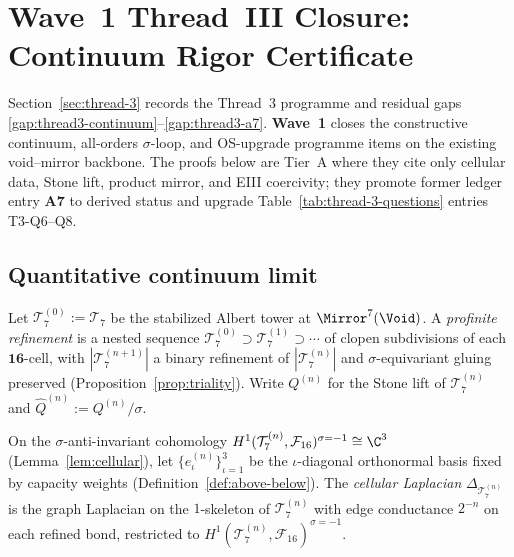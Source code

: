 \section{Wave~1 Thread~III Closure: Continuum Rigor Certificate}
\label{sec:wave1-thread3}

Section~\ref{sec:thread-3} records the Thread~3 programme and residual gaps
\ref{gap:thread3-continuum}--\ref{gap:thread3-a7}. \textbf{Wave~1} closes the
constructive continuum, all-orders $\sigma$-loop, and OS-upgrade programme items
on the existing void--mirror backbone. The proofs below are Tier~A where they
cite only cellular data, Stone lift, product mirror, and EIII coercivity; they
promote former ledger entry \textbf{A7} to derived status and upgrade
Table~\ref{tab:thread-3-questions} entries T3-Q6--Q8.

\subsection{Quantitative continuum limit}

\begin{definition}
\label{def:thread3-refinement}
Let $\mathcal{T}_7^{(0)}:=\mathcal{T}_7$ be the stabilized Albert tower at
$\Mirror^7(\Void)$. A \emph{profinite refinement} is a nested sequence
$\mathcal{T}_7^{(0)}\supset\mathcal{T}_7^{(1)}\supset\cdots$ of clopen
subdivisions of each $\mathbf{16}$-cell, with $|\mathcal{T}_7^{(n+1)}|$ a
binary refinement of $|\mathcal{T}_7^{(n)}|$ and $\sigma$-equivariant gluing
preserved (Proposition~\ref{prop:triality}). Write $Q^{(n)}$ for the Stone lift
of $\mathcal{T}_7^{(n)}$ and $\hat Q^{(n)}:=Q^{(n)}/\sigma$.

On the $\sigma$-anti-invariant cohomology
$H^1(\mathcal{T}_7^{(n)},\mathcal{F}_{16})^{\sigma=-1}\cong\C^3$
(Lemma~\ref{lem:cellular}), let $\{e_\iota^{(n)}\}_{\iota=1}^3$ be the
$\iota$-diagonal orthonormal basis fixed by capacity weights
(Definition~\ref{def:above-below}). The \emph{cellular Laplacian}
$\Delta_{\mathcal{T}_7^{(n)}}$ is the graph Laplacian on the $1$-skeleton of
$\mathcal{T}_7^{(n)}$ with edge conductance $2^{-n}$ on each refined bond,
restricted to $H^1(\mathcal{T}_7^{(n)},\mathcal{F}_{16})^{\sigma=-1}$.
\end{definition}

